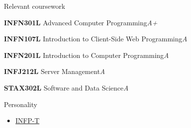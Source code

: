 \documentclass{resume} %
\begin{document}

\begin{rSection}{Relevant coursework}
\vspace{-1.25em}
\item \textbf{INFN301L} {Advanced Computer Programming}\hfill \textit{A+}
\item \textbf{INFN107L} {Introduction to Client-Side Web Programming}\hfill \textit{A}
\item \textbf{INFN201L} {Introduction to Computer Programming}\hfill \textit{A}
\item \textbf{INFJ212L} {Server Management}\hfill \textit{A}
\item \textbf{STAX302L} {Software and Data Science}\hfill \textit{A}
\end{rSection} 




\begin{rSection}{Personality} 
\begin{itemize}
    \item \href{https://www.16personalities.com/infp-personality}{INFP-T}
\end{itemize}


\end{rSection}
\end{document}
